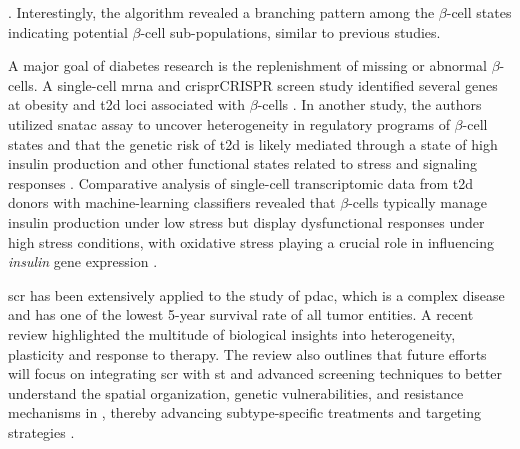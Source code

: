 \textbf{\cite{xin_pseudotime_2018}}.  Interestingly, the algorithm revealed a branching pattern among the $\beta$-cell states indicating potential $\beta$-cell sub-populations, similar to previous studies.\\

\par A major goal of diabetes research is the replenishment of missing or abnormal $\beta$-cells. A single-cell \gls{mrna} and \gls{crispr}{CRISPR} screen study identified several genes at obesity and \gls{t2d} loci associated with $\beta$-cells \textbf{\cite{fang_single-cell_2019}}. %
In another study, the authors utilized \gls{snatac} assay to uncover heterogeneity in regulatory programs of $\beta$-cell states and that the genetic risk of \gls{t2d} is likely mediated through a state of high insulin production and other functional states related to stress and signaling responses \textbf{\cite{chiou_single-cell_2021}}. %
Comparative analysis of single-cell transcriptomic data from \gls{t2d} donors with machine-learning classifiers revealed that $\beta$-cells typically manage insulin production under low stress but display dysfunctional responses under high stress conditions, with oxidative stress playing a crucial role in influencing \textit{insulin} gene expression \textbf{\cite{ma_single-cell_2018}}.\\ 

\par \gls{scr} has been extensively applied to the study of \gls{pdac}, which is a complex disease and has one of the lowest 5-year survival rate of all tumor entities. A recent review highlighted the multitude of biological insights into heterogeneity, plasticity and response to therapy. The review also outlines that future efforts will focus on integrating \gls{scr} with \gls{st} and advanced screening techniques to better understand the spatial organization, genetic vulnerabilities, and resistance mechanisms in , thereby advancing subtype-specific treatments and targeting strategies \textbf{\cite{barthel_single-cell_2023}}.

